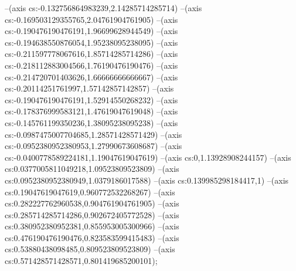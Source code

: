 --(axis cs:-0.132756864983239,2.14285714285714)
--(axis cs:-0.169503129355765,2.04761904761905)
--(axis cs:-0.190476190476191,1.96699628944549)
--(axis cs:-0.194638550876054,1.95238095238095)
--(axis cs:-0.211597778067616,1.85714285714286)
--(axis cs:-0.218112883004566,1.76190476190476)
--(axis cs:-0.214720701403626,1.66666666666667)
--(axis cs:-0.20114251761997,1.57142857142857)
--(axis cs:-0.190476190476191,1.52914550268232)
--(axis cs:-0.178376999583121,1.47619047619048)
--(axis cs:-0.145761199350236,1.38095238095238)
--(axis cs:-0.0987475007704685,1.28571428571429)
--(axis cs:-0.0952380952380953,1.27990673608687)
--(axis cs:-0.0400778589224181,1.19047619047619)
--(axis cs:0,1.13928908244157)
--(axis cs:0.0377005811049218,1.09523809523809)
--(axis cs:0.0952380952380949,1.0379186017588)
--(axis cs:0.139985298184417,1)
--(axis cs:0.19047619047619,0.960772532268267)
--(axis cs:0.282227762960538,0.904761904761905)
--(axis cs:0.285714285714286,0.902672405772528)
--(axis cs:0.380952380952381,0.855953005300966)
--(axis cs:0.476190476190476,0.823583599415483)
--(axis cs:0.53880438098485,0.809523809523809)
--(axis cs:0.571428571428571,0.801419685200101);

